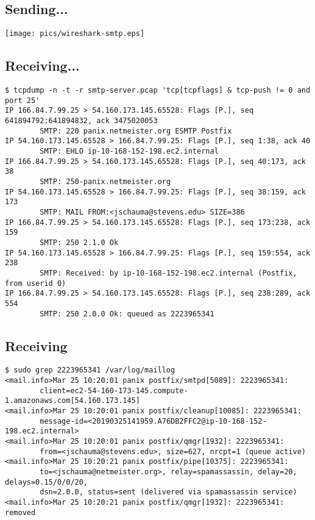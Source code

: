 \documentclass[xga]{xdvislides}
\begin{document}
\subsection{Sending...}
\begin{center}
	\texttt{[image: pics/wireshark-smtp.eps]}
\end{center}

\subsection{Receiving...}
\begin{verbatim}
$ tcpdump -n -t -r smtp-server.pcap 'tcp[tcpflags] & tcp-push != 0 and port 25'
IP 166.84.7.99.25 > 54.160.173.145.65528: Flags [P.], seq 641894792:641894832, ack 3475020053
        SMTP: 220 panix.netmeister.org ESMTP Postfix
IP 54.160.173.145.65528 > 166.84.7.99.25: Flags [P.], seq 1:38, ack 40
        SMTP: EHLO ip-10-168-152-198.ec2.internal
IP 166.84.7.99.25 > 54.160.173.145.65528: Flags [P.], seq 40:173, ack 38
        SMTP: 250-panix.netmeister.org
IP 54.160.173.145.65528 > 166.84.7.99.25: Flags [P.], seq 38:159, ack 173
        SMTP: MAIL FROM:<jschauma@stevens.edu> SIZE=386
IP 166.84.7.99.25 > 54.160.173.145.65528: Flags [P.], seq 173:238, ack 159
        SMTP: 250 2.1.0 Ok
IP 54.160.173.145.65528 > 166.84.7.99.25: Flags [P.], seq 159:554, ack 238
        SMTP: Received: by ip-10-168-152-198.ec2.internal (Postfix, from userid 0)
IP 166.84.7.99.25 > 54.160.173.145.65528: Flags [P.], seq 238:289, ack 554
        SMTP: 250 2.0.0 Ok: queued as 2223965341
\end{verbatim}

\subsection{Receiving}
\begin{verbatim}
$ sudo grep 2223965341 /var/log/maillog
<mail.info>Mar 25 10:20:01 panix postfix/smtpd[5089]: 2223965341:
        client=ec2-54-160-173-145.compute-1.amazonaws.com[54.160.173.145]
<mail.info>Mar 25 10:20:01 panix postfix/cleanup[10085]: 2223965341:
        message-id=<20190325141959.A76DB2FFC2@ip-10-168-152-198.ec2.internal>
<mail.info>Mar 25 10:20:01 panix postfix/qmgr[1932]: 2223965341:
        from=<jschauma@stevens.edu>, size=627, nrcpt=1 (queue active)
<mail.info>Mar 25 10:20:21 panix postfix/pipe[10375]: 2223965341:
        to=<jschauma@netmeister.org>, relay=spamassassin, delay=20, delays=0.15/0/0/20,
        dsn=2.0.0, status=sent (delivered via spamassassin service)
<mail.info>Mar 25 10:20:21 panix postfix/qmgr[1932]: 2223965341: removed
\end{verbatim}
\end{document}
